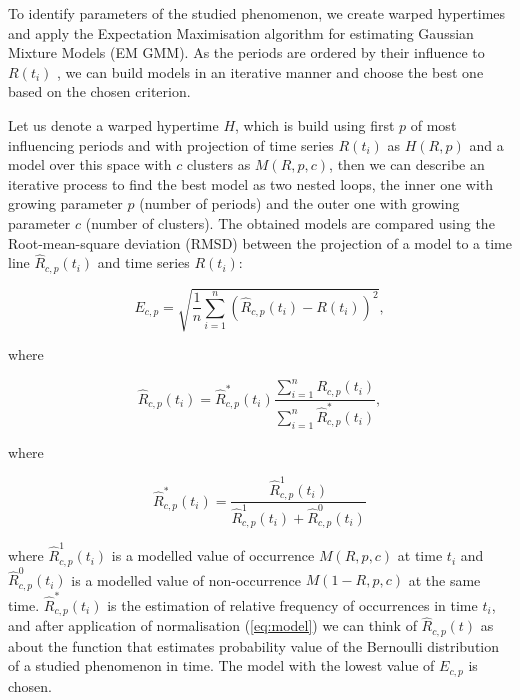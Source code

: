 To identify parameters of the studied phenomenon, we create warped hypertimes and apply the Expectation Maximisation algorithm for estimating Gaussian Mixture Models (EM GMM).
As the periods are ordered by their influence to $R(t_i)$ %
, we can build models in an iterative manner and choose the best one based on the chosen criterion.

Let us denote a warped hypertime $H$, which is build using first $p$ of most influencing periods and with projection of time series $R(t_i)$ as $H(R, p)$ and a model over this space with $c$ clusters as $M(R, p, c)$, then we can describe an iterative process to find the best model as two nested loops, the inner one with growing parameter $p$ (number of periods) and the outer one with growing parameter $c$ (number of clusters). 
The obtained models are compared using the Root-mean-square deviation (RMSD) \cite{hyndman2006another} between the projection of a model to a time line $\hat{R}_{c, p}\left(t_{i}\right)$ and time series $R\left(t_{i}\right)$:

\begin{equation}\label{eq:rmsd}
E_{c, p} = \sqrt{\frac{1}{n}\sum_{i=1}^{n}{\left(\hat{R}_{c, p}\left(t_{i}\right) - R\left(t_{i}\right)\right)^{2}}},
\end{equation}

\noindent where 

\begin{equation}\label{eq:model}
\hat{R}_{c, p}\left(t_{i}\right) = \hat{R}_{c, p}^{*}\left(t_{i}\right) \frac{\sum_{i=1}^{n}{R_{c, p}\left(t_{i}\right)}}{\sum_{i=1}^{n}{\hat{R}_{c, p}^{*}\left(t_{i}\right)}},
\end{equation}

\noindent where

\begin{equation}\label{eq:ratio}
\hat{R}_{c, p}^{*}\left(t_{i}\right) = \frac{\hat{R}_{c, p}^{1}\left(t_{i}\right)}{\hat{R}_{c, p}^{1}\left(t_{i}\right) + \hat{R}_{c, p}^{0}\left(t_{i}\right)}
\end{equation}

\noindent where $\hat{R}_{c, p}^{1}\left(t_{i}\right)$ is a modelled value of occurrence  $M\left(R, p, c\right)$ at time $t_i$ and $\hat{R}_{c, p}^{0}\left(t_{i}\right)$ is a modelled value of non-occurrence  $M\left(1 - R, p, c\right)$ at the same time.
$\hat{R}_{c, p}^{*}\left(t_{i}\right)$ is the estimation of relative frequency of occurrences in time $t_i$, and after application of normalisation (\ref{eq:model}) we can think of $\hat{R}_{c, p}\left(t\right)$ as about the function that estimates probability value of the Bernoulli distribution \cite{evans20004} of a studied phenomenon in time.
The model with the lowest value of $E_{c, p}$ is chosen. 




